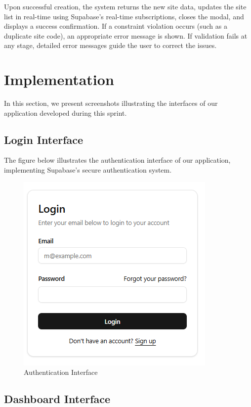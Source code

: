 Upon successful creation, the system returns the new site data, updates the site list in real-time using Supabase's real-time subscriptions, closes the modal, and displays a success confirmation. If a constraint violation occurs (such as a duplicate site code), an appropriate error message is shown. If validation fails at any stage, detailed error messages guide the user to correct the issues.

\section{Implementation}

In this section, we present screenshots illustrating the interfaces of our application developed during this sprint.

\subsection{Login Interface}

The figure below illustrates the authentication interface of our application, implementing Supabase's secure authentication system.

\begin{figure}[H]
    \centering
    \includegraphics[width=0.7\linewidth]{img/chap_03/login_interface.png}
    \caption{Authentication Interface}
    \label{fig:login_interface}
\end{figure}

\subsection{Dashboard Interface}

